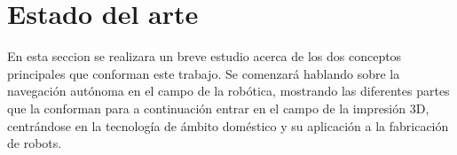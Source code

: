 \chapter{Estado del arte}
\label{estado del arte}

En esta seccion se realizara un breve estudio acerca de los dos conceptos principales que conforman este trabajo. Se comenzará hablando sobre la navegación autónoma en el campo de la robótica, mostrando las diferentes partes que la conforman para a continuación entrar en el campo de la impresión 3D, centrándose en la tecnología de ámbito doméstico y su aplicación a la fabricación de robots.


